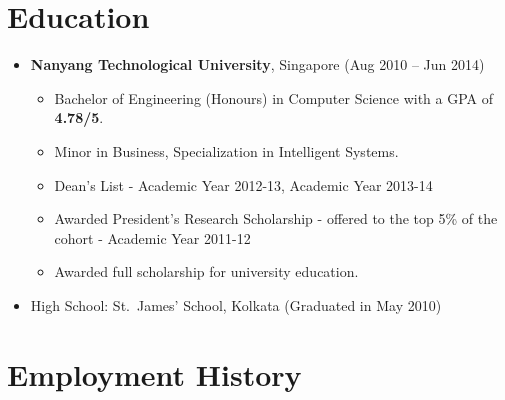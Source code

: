 
\section{Education}\label{education}

\begin{itemize}
\tightlist
\item
  \textbf{Nanyang Technological University}, Singapore \hfill (Aug 2010
  -- Jun 2014)

  \begin{itemize}
  \tightlist
  \item
    Bachelor of Engineering (Honours) in Computer Science with a GPA of
    \textbf{4.78/5}.
  \item
    Minor in Business, Specialization in Intelligent Systems.
  \item
    Dean's List - Academic Year 2012-13, Academic Year 2013-14
  \item
    Awarded President's Research Scholarship - offered to the top 5\% of
    the cohort - Academic Year 2011-12
  \item
    Awarded full scholarship for university education.
  \end{itemize}
\item
  High School: St.~James' School, Kolkata \hfill (Graduated in May 2010)
\end{itemize}

\section{Employment History}\label{employment-history}

